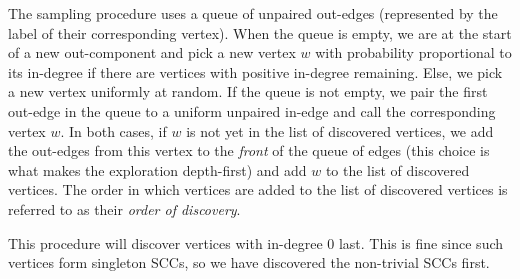 
The sampling procedure uses a queue of unpaired out-edges (represented by the label of their corresponding vertex). When the queue is empty, we are at the start of a new out-component and pick a new vertex $w$ with probability proportional to its in-degree if there are vertices with positive in-degree remaining. Else, we pick a new vertex uniformly at random. If the queue is not empty, we pair the first out-edge in the queue to a uniform unpaired in-edge and call the corresponding vertex $w$. In both cases, if $w$ is not yet in the list of discovered vertices, we add the out-edges from this vertex to the \emph{front} of the queue of edges (this choice is what makes the exploration depth-first) and add $w$ to the list of discovered vertices. The order in which vertices are added to the list of discovered vertices is referred to as their \emph{order of discovery}. 

This procedure will discover vertices with in-degree 0 last. This is fine since such vertices form singleton SCCs, so we have discovered the non-trivial SCCs first.

